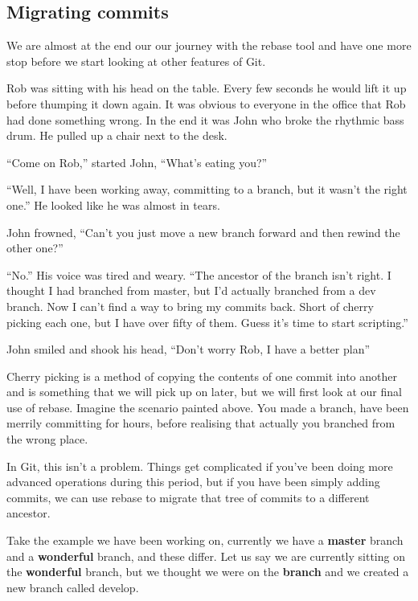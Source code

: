 \subsection{Migrating commits}

We are almost at the end our our journey with the rebase tool and have one more stop before we start looking at other features of Git.

\begin{trenches}
Rob was sitting with his head on the table.
Every few seconds he would lift it up before thumping it down again.
It was obvious to everyone in the office that Rob had done something wrong.
In the end it was John who broke the rhythmic bass drum.
He pulled up a chair next to the desk.

``Come on Rob,'' started John,
``What's eating you?''

``Well, I have been working away, committing to a branch, but it wasn't the right one.''
He looked like he was almost in tears.

John frowned, ``Can't you just move a new branch forward and then rewind the other one?''

``No.''
His voice was tired and weary.
``The ancestor of the branch isn't right. I thought I had branched from master, but I'd actually branched from a dev branch. Now I can't find a way to bring my commits back. Short of cherry picking each one, but I have over fifty of them. Guess it's time to start scripting.''

John smiled and shook his head, ``Don't worry Rob, I have a better plan''
\end{trenches}

Cherry picking is a method of copying the contents of one commit into another and is something that we will pick up on later, but we will first look at our final use of rebase.
Imagine the scenario painted above.
You made a branch, have been merrily committing for hours, before realising that actually you branched from the wrong place.

In Git, this isn't a problem.
Things get complicated if you've been doing more advanced operations during this period, but if you have been simply adding commits, we can use rebase to migrate that tree of commits to a different ancestor.

Take the example we have been working on, currently we have a \textbf{master} branch and a \textbf{wonderful} branch, and these differ.
Let us say we are currently sitting on the \textbf{wonderful} branch, but we thought we were on the \textbf{branch} and we created a new branch called develop.

